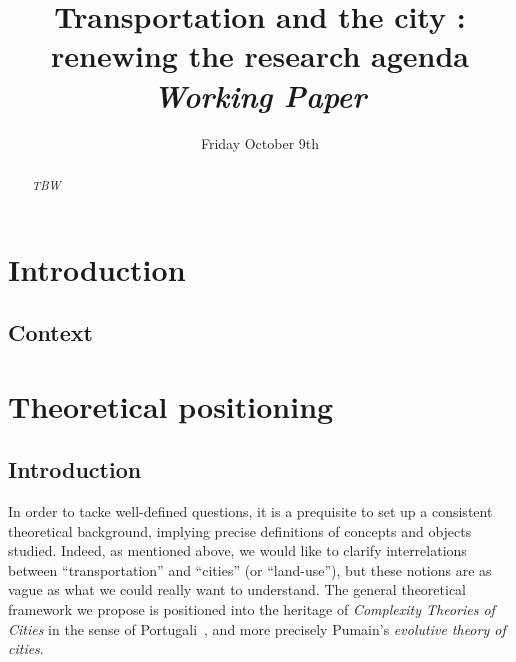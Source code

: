 


\title{Transportation and the city : renewing the research agenda
\bigskip\\
\textit{Working Paper}
}
\author{}
\date{Friday October 9th}


\maketitle

\justify


\begin{abstract}
\textit{TBW}
\end{abstract}


\section{Introduction}



\subsection{Context}



\section{Theoretical positioning}

\subsection{Introduction}

In order to tacke well-defined questions, it is a prequisite to set up a consistent theoretical background, implying precise definitions of concepts and objects studied. Indeed, as mentioned above, we would like to clarify interrelations between ``transportation'' and ``cities'' (or ``land-use''), but these notions are as vague as what we could really want to understand.
The general theoretical framework we propose is positioned into the heritage of \emph{Complexity Theories of Cities} in the sense of Portugali~\cite{portugali2012complexity}, and more precisely Pumain's \emph{evolutive theory of cities}.

